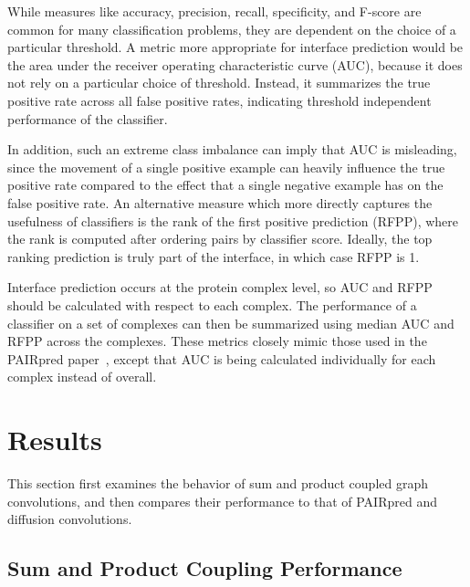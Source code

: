 While measures like accuracy, precision, recall, specificity, and F-score are common for many classification problems, they are dependent on the choice of a particular threshold.
A metric more appropriate for interface prediction would be the area under the receiver operating characteristic curve (AUC), because it does not rely on a particular choice of threshold.
Instead, it summarizes the true positive rate across all false positive rates, indicating threshold independent performance of the classifier.

In addition, such an extreme class imbalance can imply that AUC is misleading, since the movement of a single positive example can heavily influence the true positive rate compared to the effect that a single negative example has on the false positive rate.
An alternative measure which more directly captures the usefulness of classifiers is the rank of the first positive prediction (RFPP), where the rank is computed after ordering pairs by classifier score.
Ideally, the top ranking prediction is truly part of the interface, in which case RFPP is 1.

Interface prediction occurs at the protein complex level, so AUC and RFPP should be calculated with respect to each complex. 
The performance of a classifier on a set of complexes can then be summarized using median AUC and RFPP across the complexes.
These metrics closely mimic those used in the PAIRpred paper~\cite{minhas2014}, except that AUC is being calculated individually for each complex instead of overall.

\section{Results}

This section first examines the behavior of sum and product coupled graph convolutions, and then compares their performance to that of PAIRpred and diffusion convolutions.

\subsection{Sum and Product Coupling Performance}

